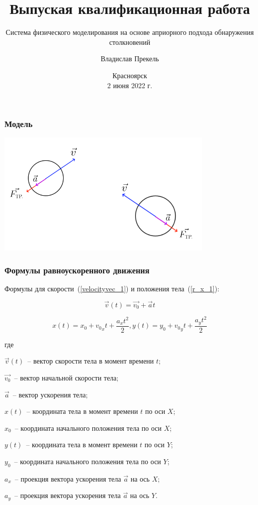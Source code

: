 \documentclass[xetex,aspectratio=43]{beamer}
\title{Выпуская квалификационная работа}
\subtitle{Система физического моделирования на основе априорного подхода обнаружения столкновений}
\author{Владислав Прекель}
\institute{ИКИТ СФУ\\КИ18-16б}
\date{Красноярск\\2 июня 2022 г.}
\newenvironment{Underequation}{
    \small
    \noindent
    где
    \hspace{-1.45ex}
    \setlength{\parindent}{3.5ex}
}{}
\begin{document}
\begin{frame}
    \titlepage
\end{frame}

\begin{frame}
    \frametitle{Модель}

    \includegraphics[height=6cm]{body_init}

\end{frame}

\begin{frame}
    \frametitle{Формулы равноускоренного движения}
    Формулы для скорости~(\ref{velocityvec_1}) и положения тела~(\ref{r_x_1}):

    \begin{equation}\label{velocityvec_1}
        \vec{v}(t) = \vec{v_0} + \vec{a}t
    \end{equation}

    \begin{equation}\label{r_x_1}
        x(t) = x_0 + {v_0}_x t + \frac{a_x t^2}{2},
        y(t) = y_0 + {v_0}_y t + \frac{a_y t^2}{2}
    \end{equation}


    \begin{Underequation}
        \(\vec{v}(t)\)~-- вектор скорости тела в момент времени \(t\);

        \(\vec{v_0}\)~-- вектор начальной скорости тела;

        \(\vec{a}\)~-- вектор ускорения тела;

        \(x(t)\)~-- координата тела в момент времени \(t\) по оси \(X\);

        \(x_0\)~-- координата начального положения тела по оси \(X\);

        \(y(t)\)~-- координата тела в момент времени \(t\) по оси \(Y\);

        \(y_0\)~-- координата начального положения тела по оси \(Y\);

        \(a_x\)~-- проекция вектора ускорения тела \(\vec{a}\) на ось \(X\);

        \(a_y\)~-- проекция вектора ускорения тела \(\vec{a}\) на ось \(Y\).
    \end{Underequation}
\end{frame}
\end{document}
